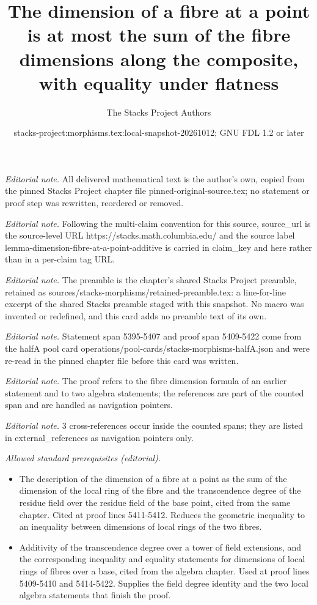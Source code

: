 \documentclass[10pt,a4paper]{amsart}
\title{The dimension of a fibre at a point is at most the sum of the fibre dimensions along the composite, with equality under flatness}
\author{The Stacks Project Authors}
\date{stacks-project:morphisms.tex:local-snapshot-20261012; GNU FDL 1.2 or later}
\theoremstyle{plain}
\theoremstyle{definition}
\theoremstyle{remark}
\numberwithin{equation}{subsection}
\begin{document}
\maketitle
\noindent\textit{Editorial note.} All delivered mathematical text is the author's own, copied from the pinned Stacks Project chapter file pinned-original-source.tex; no statement or proof step was rewritten, reordered or removed.\par\medskip
\noindent\textit{Editorial note.} Following the multi-claim convention for this source, source\_url is the source-level URL https://stacks.math.columbia.edu/ and the source label lemma-dimension-fibre-at-a-point-additive is carried in claim\_key and here rather than in a per-claim tag URL.\par\medskip
\noindent\textit{Editorial note.} The preamble is the chapter's shared Stacks Project preamble, retained as sources/stacks-morphisms/retained-preamble.tex: a line-for-line excerpt of the shared Stacks preamble staged with this snapshot. No macro was invented or redefined, and this card adds no preamble text of its own.\par\medskip
\noindent\textit{Editorial note.} Statement span 5395-5407 and proof span 5409-5422 come from the halfA pool card operations/pool-cards/stacks-morphisms-halfA.json and were re-read in the pinned chapter file before this card was written.\par\medskip
\noindent\textit{Editorial note.} The proof refers to the fibre dimension formula of an earlier statement and to two algebra statements; the references are part of the counted span and are handled as navigation pointers.\par\medskip
\noindent\textit{Editorial note.} 3 cross-references occur inside the counted spans; they are listed in external\_references as navigation pointers only.\par\medskip
\noindent\textit{Allowed standard prerequisites (editorial).}\begin{itemize}
\item The description of the dimension of a fibre at a point as the sum of the dimension of the local ring of the fibre and the transcendence degree of the residue field over the residue field of the base point, cited from the same chapter. Cited at proof lines 5411-5412. Reduces the geometric inequality to an inequality between dimensions of local rings of the two fibres.
\item Additivity of the transcendence degree over a tower of field extensions, and the corresponding inequality and equality statements for dimensions of local rings of fibres over a base, cited from the algebra chapter. Used at proof lines 5409-5410 and 5414-5422. Supplies the field degree identity and the two local algebra statements that finish the proof.
\end{itemize}\medskip
\end{document}

